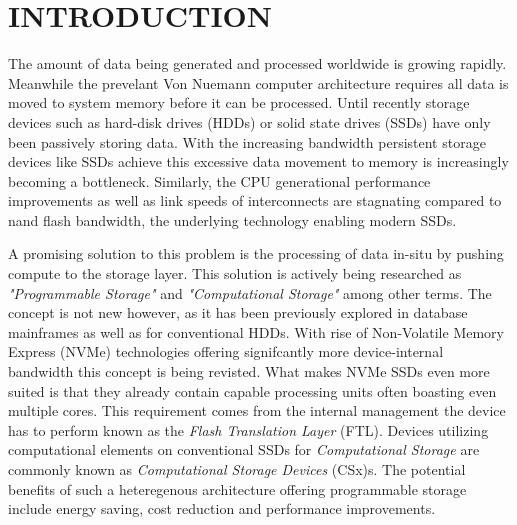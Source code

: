 \documentclass[conference]{IEEEtran}
\begin{document}
\clearpage
\onecolumn

\hypersetup{
	linkcolor=black
}

\renewcommand{\contentsname}{CONTENTS}
\tableofcontents{}

\hypersetup{
	linkcolor=blue
}

\twocolumn

\section*{INTRODUCTION}



The amount of data being generated and processed worldwide is growing rapidly.
Meanwhile the prevelant Von Nuemann computer architecture requires all data is 
moved to system memory before it can be processed\cite{2018-neumann-bottleneck}.
Until recently storage devices such as hard-disk drives (HDDs) or solid state
drives (SSDs) have only been passively storing data. With the increasing
bandwidth persistent storage devices like SSDs achieve this excessive data
movement to memory is increasingly becoming a bottleneck\cite{2014-micro-ndp}.
Similarly, the CPU generational performance
improvements\cite{2016-western-digital} as well as link speeds of interconnects
are stagnating compared to nand flash bandwidth\cite{10.1145/3286588}, the
underlying technology enabling modern SSDs.


A promising solution to this problem is the processing of data in-situ by
pushing compute to the storage layer. This solution is actively being researched
as \textit{"Programmable Storage"} and \textit{"Computational Storage"} among
other terms. The concept is not new however, as it has been previously
explored in database mainframes\cite{database-computer} as well as for
conventional HDDs\cite{active-disk-pillar, active-disks-tech, intelligent-disk}.
With rise of Non-Volatile Memory Express (NVMe) technologies offering signifcantly more 
device-internal bandwidth this concept is being revisted. What makes NVMe SSDs
even more suited is that they already contain capable processing units often
boasting even multiple cores. This requirement comes from the internal
management the device has to perform known as the
\textit{Flash Translation Layer} (FTL). Devices utilizing computational elements
on conventional SSDs for \textit{Computational Storage} are commonly known as
\textit{Computational Storage Devices} (CSx)s. The potential benefits of such a
heteregenous architecture offering programmable storage include energy saving,
cost reduction and performance improvements.
\end{document}
